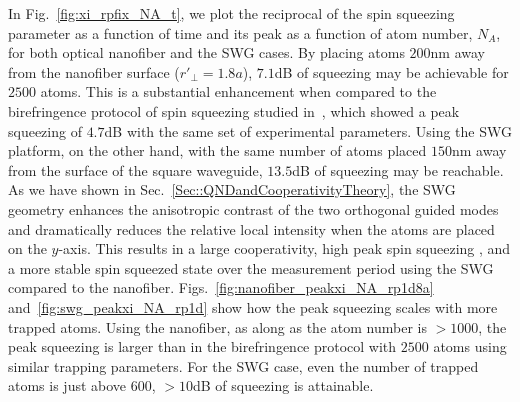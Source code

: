 \documentclass[preprint,aps,pra,onecolumn,superscriptaddress]{revtex4-1} %
\begin{document}
In Fig.~\ref{fig:xi_rpfix_NA_t}, we plot the reciprocal of the spin squeezing parameter as a function of time and its peak as a function of atom number, $ N_A $, for both optical nanofiber and the SWG cases. By placing atoms $ 200 $nm away from the nanofiber surface ($ r'\!_\perp=1.8a $), $ 7.1 $dB of squeezing may be achievable for $ 2500 $ atoms. This is a substantial enhancement when compared to the birefringence protocol of spin squeezing  studied in~\cite{Qi2016}, which showed a peak squeezing  of $ 4.7 $dB with the same set of experimental parameters. Using the SWG platform, on the other hand, with the same number of atoms placed $150 $nm away from the surface of the square waveguide, $13.5$dB of squeezing may be reachable. As we have shown in Sec.~\ref{Sec::QNDandCooperativityTheory}, the SWG geometry enhances the anisotropic contrast of the two orthogonal guided modes and dramatically reduces the relative local intensity when the atoms are placed on the $ y $-axis. This results in a large cooperativity, high peak spin squeezing , and a more stable spin squeezed state over the measurement period using the SWG compared to the nanofiber. Figs.~\ref{fig:nanofiber_peakxi_NA_rp1d8a} and~\ref{fig:swg_peakxi_NA_rp1d} show how the peak squeezing scales with more trapped atoms. Using the nanofiber, as along as the atom number is  $>1000 $, the peak  squeezing  is larger than in the birefringence protocol with $ 2500 $ atoms using similar trapping parameters. For the SWG case, even the number of trapped atoms is just above $ 600 $, $ >10 $dB of  squeezing is attainable. 
\end{document}
